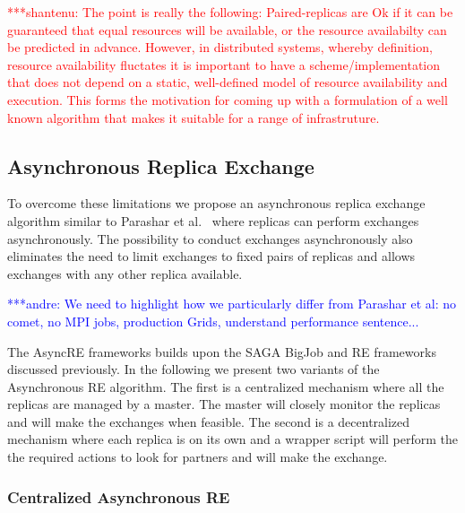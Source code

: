 \documentclass[a4paper,10pt]{article}
\newcommand{\jhanote}[1]{ {\textcolor{red} { ***shantenu: #1 }}}
\newcommand{\alnote}[1]{ {\textcolor{blue} { ***andre: #1 }}}
\newcommand{\alnote}[1]{}
\newcommand{\jhanote}[1]{}
\begin{document}
\jhanote{The point is really the following: Paired-replicas are Ok if
  it can be guaranteed that equal resources will be available, or the
  resource availabilty can be predicted in advance. However, in
  distributed systems, whereby definition, resource availability
  fluctates it is important to have a scheme/implementation that does
  not depend on a static, well-defined model of resource availability
  and execution. This forms the motivation for coming up with a
  formulation of a well known algorithm that makes it suitable for a
  range of infrastruture.}
  

  
\subsection{Asynchronous Replica Exchange}

To overcome these limitations we propose an asynchronous replica
exchange algorithm similar to Parashar et al.~\cite{parashar_arepex}
where replicas can perform exchanges asynchronously. The possibility
to conduct exchanges asynchronously also eliminates the need to limit
exchanges to fixed pairs of replicas and allows exchanges with any
other replica available.
 
\alnote{We need to highlight how we particularly differ from Parashar
  et al: no comet, no MPI jobs, production Grids, understand
  performance sentence...}

The AsyncRE frameworks builds upon the SAGA BigJob and RE frameworks
discussed previously.  In the following we present two variants of the
Asynchronous RE algorithm. The first is a centralized mechanism where
all the replicas are managed by a master. The master will closely
monitor the replicas and will make the exchanges when feasible.  The
second is a decentralized mechanism where each replica is on its own
and a wrapper script will perform the the required actions to look for
partners and will make the exchange.



\subsubsection{Centralized Asynchronous RE}
\end{document}
